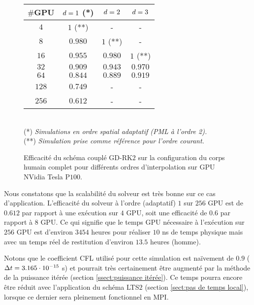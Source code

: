 \begin{figure}[!h]
	\begin{center}
		\caption{
			\label{tab:scala_pizdaint}
			Efficacité du schéma couplé GD-RK$2$ sur la configuration
			du corps humain complet pour différents ordres d'interpolation
			sur GPU NVidia Tesla P$100$.
		}
		
		\begin{tabular}{|c|c|c|c|}
			\hline
			$\#$GPU & $d = 1$ (*) & $d = 2$ & $d = 3$ \\ \hline\hline
			$4$ & $1$ (**) & - & - \\	\hline
			$8$ & $0.980$ & $1$ (**) & - \\	\hline
			$16$ & $0.955$ & $0.980$ & $1$ (**) \\	\hline
			$32$ & $0.909$ & $0.943$ & $0.970$ \\	\hline
			$64$ & $0.844$ & $0.889$ & $0.919$ \\	\hline
			$128$ & $0.749$ & - & - \\	\hline
			$256$ & $0.612$ & - & - \\	\hline
		\end{tabular}
		\\
		(*) \textit{Simulations en ordre spatial adaptatif (PML à l'ordre 2).}
		\\
		(**) \textit{Simulation prise comme référence pour l'ordre courant.}
	\end{center}
\end{figure}


Nous constatons que la scalabilité du solveur est très
bonne sur ce cas d'application.
L’efficacité du solveur à l’ordre (adaptatif) $1$ sur $256$ GPU
est de $0.612$ par rapport à une exécution sur $4$ GPU,
soit une efficacité de $0.6$ par rapport à $8$ GPU.
Ce qui signifie que le temps GPU
nécessaire à l’exécution sur $256$ GPU est d’environ
$3454$ heures pour réaliser $10$ ns de temps physique
mais avec un temps réel de restitution d’environ $13.5$ heures (homme).


Notons que le coefficient CFL utilisé pour cette simulation est naïvement de
$0.9$ ($\Delta t = 3.165 \cdot 10^{-15}$ s) et pourrait très certainement être augmenté par la méthode
de la puissance itérée (section \ref{ssect:puissance itérée}).
Ce temps pourra encore être réduit avec l'application du schéma LTS$2$
(section \ref{sect:pas de temps local}), lorsque ce dernier
sera pleinement fonctionnel en MPI.
\\



